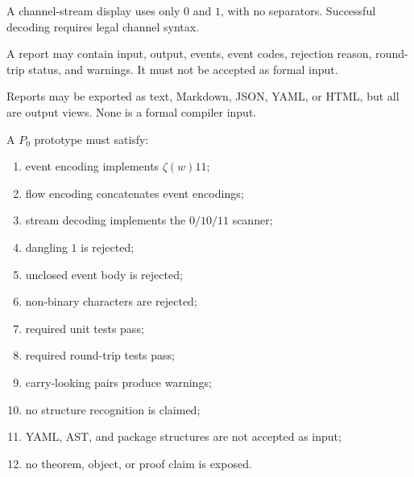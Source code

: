 \begin{definition}
\label{def:minimal-prototype-channel-display-format}
A channel-stream display uses only $0$ and $1$, with no separators. Successful decoding requires legal channel syntax.
\end{definition}

\begin{definition}
\label{def:minimal-prototype-report-format}
A report may contain input, output, events, event codes, rejection reason, round-trip status, and warnings. It must not be accepted as formal input.
\end{definition}

\begin{principle}
\label{prin:minimal-prototype-reports-output-views}
Reports may be exported as text, Markdown, JSON, YAML, or HTML, but all are output views. None is a formal compiler input.
\end{principle}

\begin{definition}
\label{def:minimal-prototype-audit-checklist}
A $P_0$ prototype must satisfy:
\begin{enumerate}
\item event encoding implements $\zeta(w)11$;
\item flow encoding concatenates event encodings;
\item stream decoding implements the $0/10/11$ scanner;
\item dangling $1$ is rejected;
\item unclosed event body is rejected;
\item non-binary characters are rejected;
\item required unit tests pass;
\item required round-trip tests pass;
\item carry-looking pairs produce warnings;
\item no structure recognition is claimed;
\item YAML, AST, and package structures are not accepted as input;
\item no theorem, object, or proof claim is exposed.
\end{enumerate}
\end{definition}

